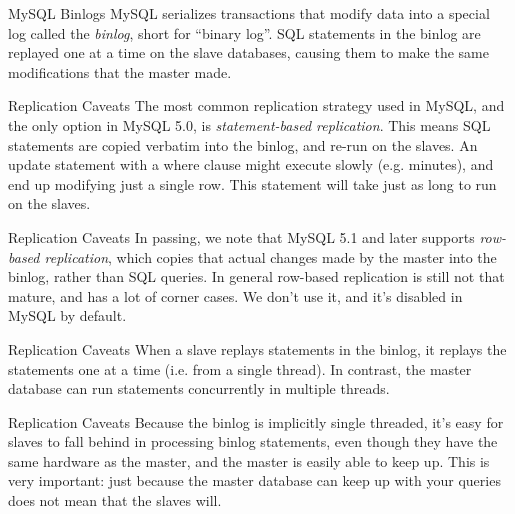\documentclass[14pt]{beamer}
\begin{document}
\begin{frame}{MySQL Binlogs}
  MySQL serializes transactions that modify data into a special log called the
  \emph{binlog}, short for ``binary log''.
  \newline
  \newline
  SQL statements in the binlog are replayed one at a time on the slave
  databases, causing them to make the same modifications that the master made.
\end{frame}

\begin{frame}{Replication Caveats}
  The most common replication strategy used in MySQL, and the only option in
  MySQL 5.0, is \emph{statement-based replication}. This means SQL statements
  are copied verbatim into the binlog, and re-run on the slaves.
  \newline
  \newline
  An update statement with a where clause might execute slowly (e.g. minutes),
  and end up modifying just a single row. This statement will take just as long
  to run on the slaves.
\end{frame}

\begin{frame}{Replication Caveats}
  In passing, we note that MySQL 5.1 and later supports \emph{row-based
    replication}, which copies that actual changes made by the master into the
  binlog, rather than SQL queries.
  \newline
  \newline
  In general row-based replication is still not that mature, and has a lot of
  corner cases. We don't use it, and it's disabled in MySQL by default.
\end{frame}

\begin{frame}{Replication Caveats}
  When a slave replays statements in the binlog, it replays the statements one
  at a time (i.e. from a single thread). In contrast, the master database can
  run statements concurrently in multiple threads.
\end{frame}

\begin{frame}{Replication Caveats}
  Because the binlog is implicitly single threaded, it's easy for slaves to fall
  behind in processing binlog statements, even though they have the same
  hardware as the master, and the master is easily able to keep up.
  \newline
  \newline
  This is very important: just because the master database can keep up with your
  queries does not mean that the slaves will.
\end{frame}
\end{document}
